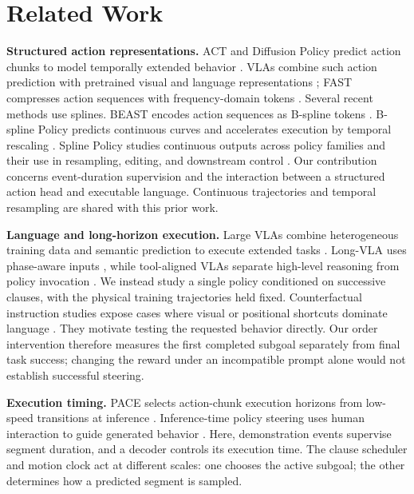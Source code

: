 \section{Related Work}
\label{sec:related_works}

\textbf{Structured action representations.}
ACT and Diffusion Policy predict action chunks to model temporally extended behavior \cite{zhao2023act,chi2023diffusion}. VLAs combine such action prediction with pretrained visual and language representations \cite{black2024pi0,shukor2025smolvla}; FAST compresses action sequences with frequency-domain tokens \cite{pertsch2025fast}. Several recent methods use splines. BEAST encodes action sequences as B-spline tokens \cite{zhou2025beast}. B-spline Policy predicts continuous curves and accelerates execution by temporal rescaling \cite{han2026bsp}. Spline Policy studies continuous outputs across policy families and their use in resampling, editing, and downstream control \cite{tian2026spline}. Our contribution concerns event-duration supervision and the interaction between a structured action head and executable language. Continuous trajectories and temporal resampling are shared with this prior work.

\textbf{Language and long-horizon execution.}
Large VLAs combine heterogeneous training data and semantic prediction to execute extended tasks \cite{black2025pi05}. Long-VLA uses phase-aware inputs \cite{fan2025longvla}, while tool-aligned VLAs separate high-level reasoning from policy invocation \cite{lei2026tools}. We instead study a single policy conditioned on successive clauses, with the physical training trajectories held fixed. Counterfactual instruction studies expose cases where visual or positional shortcuts dominate language \cite{glossop2025cast,fang2026counterfactual}. They motivate testing the requested behavior directly. Our order intervention therefore measures the first completed subgoal separately from final task success; changing the reward under an incompatible prompt alone would not establish successful steering.

\textbf{Execution timing.}
PACE selects action-chunk execution horizons from low-speed transitions at inference \cite{nie2026pace}. Inference-time policy steering uses human interaction to guide generated behavior \cite{wang2025itps}. Here, demonstration events supervise segment duration, and a decoder controls its execution time. The clause scheduler and motion clock act at different scales: one chooses the active subgoal; the other determines how a predicted segment is sampled.
